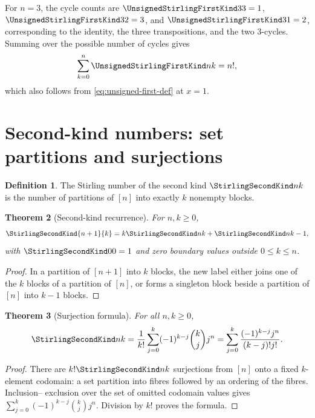 \documentclass[11pt,a4paper,oneside,openany]{book}
\newtheorem{theorem}{Theorem}[chapter]
\theoremstyle{definition}
\newtheorem{definition}[theorem]{Definition}
\theoremstyle{remark}
\begin{document}
For $n=3$, the cycle counts are $\UnsignedStirlingFirstKind33=1$, $\UnsignedStirlingFirstKind32=3$, and
$\UnsignedStirlingFirstKind31=2$, corresponding to the identity, the three transpositions, and the two
$3$-cycles.  Summing over the possible number of cycles gives
\begin{equation}\label{eq:first-row-sum}
 \sum_{k=0}^n\UnsignedStirlingFirstKind nk=n!,
\end{equation}
which also follows from \cref{eq:unsigned-first-def} at $x=1$.

\section{Second-kind numbers: set partitions and surjections}
\begin{definition}
The Stirling number of the second kind $\StirlingSecondKind nk$ is the number of partitions of
$[n]$ into exactly $k$ nonempty blocks.
\end{definition}

\begin{theorem}[Second-kind recurrence]\label{thm:second-recurrence}
For $n,k\ge0$,
\begin{equation}\label{eq:second-recurrence}
 \StirlingSecondKind{n+1}{k}=k\StirlingSecondKind nk+\StirlingSecondKind n{k-1},
\end{equation}
with $\StirlingSecondKind00=1$ and zero boundary values outside $0\le k\le n$.
\end{theorem}
\begin{proof}
In a partition of $[n+1]$ into $k$ blocks, the new label either joins one of the $k$
blocks of a partition of $[n]$, or forms a singleton block beside a partition of
$[n]$ into $k-1$ blocks.
\end{proof}

\begin{theorem}[Surjection formula]\label{thm:second-explicit}
For all $n,k\ge0$,
\begin{equation}\label{eq:second-explicit}
 \StirlingSecondKind nk=\frac1{k!}\sum_{j=0}^k(-1)^{k-j}\binom kjj^n
 =\sum_{j=0}^k\frac{(-1)^{k-j}j^n}{(k-j)!j!}.
\end{equation}
\end{theorem}
\begin{proof}
There are $k!\StirlingSecondKind nk$ surjections from $[n]$ onto a fixed $k$-element codomain:
a set partition into fibres followed by an ordering of the fibres.  Inclusion--
exclusion over the set of omitted codomain values gives
$\sum_{j=0}^k(-1)^{k-j}\binom kjj^n$.  Division by $k!$ proves the formula.
\end{proof}
\end{document}
